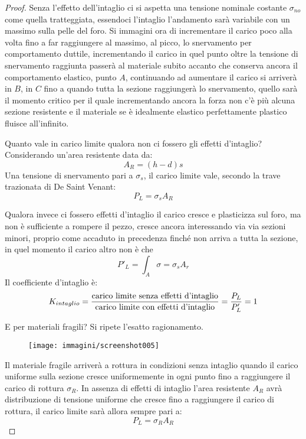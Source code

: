 \documentclass{article}
\begin{document}
\begin{adjustwidth}{2in}{}
\begin{proof}
			
			Senza l'effetto dell'intaglio ci si aspetta una tensione nominale costante $\sigma_{no}$ come quella tratteggiata, essendoci l'intaglio l'andamento sarà variabile con un massimo sulla pelle del foro. Si immagini ora di incrementare il carico poco alla volta fino a far raggiungere al massimo, al picco, lo snervamento per comportamento duttile, incrementando il carico in quel punto oltre la tensione di snervamento raggiunta passerà al materiale subito accanto che conserva ancora il comportamento elastico, punto $A$, continuando ad aumentare il carico si arriverà in  $B$, in $C$ fino a quando tutta la sezione raggiungerà lo snervamento, quello sarà il momento critico per il quale incrementando ancora la forza  non c'è più alcuna sezione resistente e il materiale se è idealmente elastico perfettamente plastico fluisce all'infinito. \newline 
			
			Quanto vale in carico limite qualora non ci fossero gli effetti d'intaglio?  Considerando un'area resistente data da:
			\[A_R = (h-d)s\]
			Una tensione di snervamento pari a $\sigma_s$, il carico limite vale, secondo la trave trazionata di De Saint Venant: 
			\[P_L = \sigma_sA_R\]
			
			Qualora invece ci fossero effetti d'intaglio il carico cresce e plasticizza sul foro, ma non è sufficiente a rompere il pezzo, cresce ancora interessando via via sezioni minori, proprio come accaduto in precedenza  finché non arriva a tutta la sezione, in quel momento il carico altro non è che \[P'_L = \int_A\sigma = \sigma_sA_r\] Il coefficiente d'intaglio è:
			\[K_{intaglio} = \dfrac{\text{carico limite senza effetti d'intaglio}}{\text{carico limite con effetti d'intaglio}} = {P_L\over P'_L} = 1\]
			
			E per materiali fragili? Si ripete l'esatto ragionamento. 
			
			\begin{figure}[H]
				\centering
				\texttt{[image: immagini/screenshot005]}
				\label{fig:screenshot005}
			\end{figure}
						
			Il materiale fragile arriverà a rottura in condizioni senza intaglio quando il carico uniforme sulla sezione cresce uniformemente in ogni punto fino a raggiungere il carico di rottura $\sigma_R$. In assenza di effetti di intaglio l'area resistente $A_R$ avrà distribuzione di tensione uniforme che cresce fino a raggiungere il carico di rottura, il carico limite sarà allora sempre pari a:
			\[P_L = \sigma_RA_R\]
			

\end{proof}
\end{adjustwidth}
\end{document}
